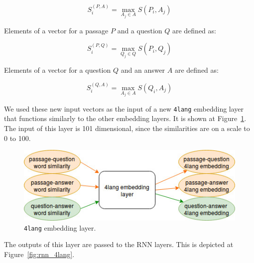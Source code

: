 \[S^{(P, A)}_i = \max_{A_j \in A} S(P_i, A_j)\]

Elements of a vector for a passage $P$ and a question $Q$ are defined as:

\[S^{(P, Q)}_i = \max_{Q_j \in Q} S(P_i, Q_j)\]

Elements of a vector for a question $Q$ and an answer $A$ are defined as:

\[S^{(Q, A)}_i = \max_{A_j \in A} S(Q_i, A_j)\]

We used these new input vectors as the input of a new \texttt{4lang} embedding layer that functions similarly to the other embedding layers. It is shown at Figure~\ref{fig:4lang_embedding}. The input of this layer is 101 dimensional, since the similarities are on a scale to 0 to 100.

\begin{figure}[h!]
	\centering
	\includegraphics[scale=0.5]{figures/4lang_embedding.jpg}
	\caption{\texttt{4lang} embedding layer.}
	\label{fig:4lang_embedding}
\end{figure}

The outputs of this layer are passed to the RNN layers. This is depicted at Figure~\ref{fig:rnn_4lang}.

